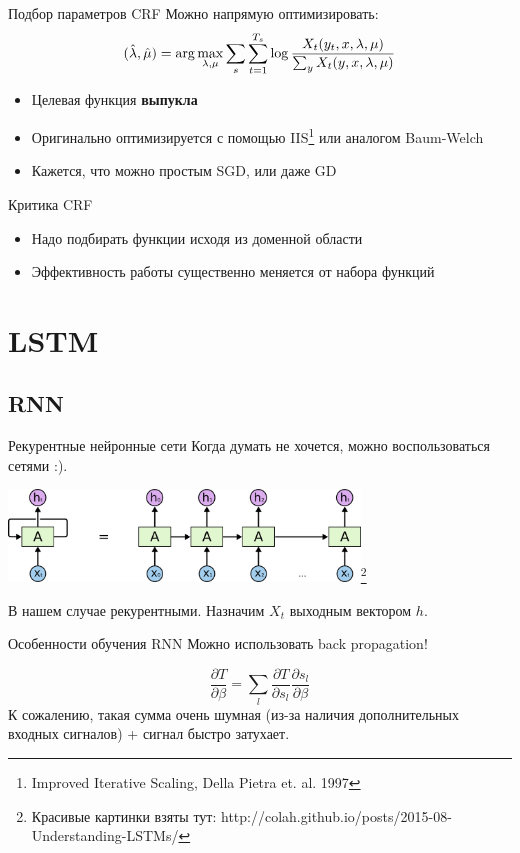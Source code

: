 \documentclass[14pt, fleqn, xcolor={dvipsnames, table}]{beamer}
\begin{document}
\begin{frame}{Подбор параметров CRF}
Можно напрямую оптимизировать:
$$
(\hat{\lambda}, \hat{\mu}) = \arg \max_{\lambda, \mu} \sum_s \sum_{t=1}^{T_s} \log {X_t(y_t, x, \lambda, \mu) \over \sum_y X_t(y, x, \lambda, \mu)}
$$
\begin{itemize}
  \item Целевая функция {\bf выпукла}
  \item Оригинально оптимизируется с помощью IIS\footnote{Improved Iterative Scaling, Della Pietra et. al. 1997} или аналогом Baum-Welch
  \item Кажется, что можно простым SGD, или даже GD
\end{itemize}
\end{frame}

\begin{frame}{Критика CRF}
\begin{itemize}
  \item Надо подбирать функции исходя из доменной области
  \item Эффективность работы существенно меняется от набора функций
\end{itemize}
\end{frame}

\section{LSTM}

\subsection{RNN}
\begin{frame}{Рекурентные нейронные сети}
Когда думать не хочется, можно воспользоваться сетями :).
\begin{center}
\includegraphics[width=0.7\textwidth]{RNN-unrolled.png}\footnote{Красивые картинки взяты тут: http://colah.github.io/posts/2015-08-Understanding-LSTMs/}
\end{center}
В нашем случае рекурентными. Назначим $X_t$ выходным вектором $h$.
\end{frame}

\begin{frame}{Особенности обучения RNN}
Можно использовать back propagation!

$$
\frac{\partial T}{\partial \beta} = \sum_l \frac{\partial T}{\partial s_l} \frac{\partial s_l}{\partial \beta}
$$
К сожалению, такая сумма очень шумная (из-за наличия дополнительных входных сигналов) + сигнал быстро затухает.
\end{frame}
\end{document}
